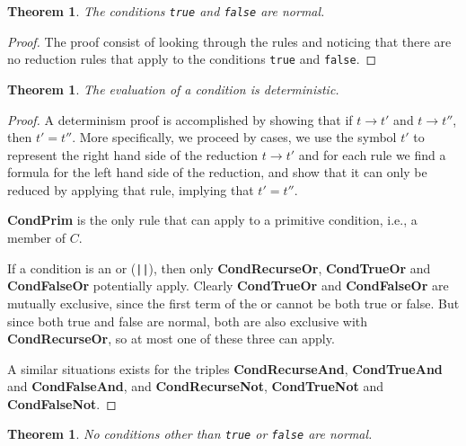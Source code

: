 \documentclass[11pt]{article}
\begin{document}
\newtheorem*{truefalsearenormal}{Theorem}
\begin{truefalsearenormal}
The conditions \texttt{true} and \texttt{false} are normal.
\end{truefalsearenormal}

\begin{proof}
The proof consist of looking through the rules and noticing that there are no reduction rules that apply to the conditions \texttt{true} and \texttt{false}.
\end{proof}

\newtheorem*{conditiondeterminism}{Theorem}
\begin{conditiondeterminism}
The evaluation of a condition is deterministic.
\end{conditiondeterminism}

\begin{proof}

A determinism proof is accomplished by showing that if $t \rightarrow t'$ and $t \rightarrow t''$, then $t' = t''$.  More specifically, we proceed by cases, we use the symbol $t'$ to represent the right hand side of the reduction $t \rightarrow t'$ and for each rule we find a formula for the left hand side of the reduction, and show that it can only be reduced by applying that rule, implying that $t' = t''$.

\textbf{CondPrim} is the only rule that can apply to a primitive condition, i.e., a member of $C$.

If a condition is an or (\texttt{||}), then only \textbf{CondRecurseOr}, \textbf{CondTrueOr} and \textbf{CondFalseOr} potentially apply.  Clearly \textbf{CondTrueOr} and \textbf{CondFalseOr} are mutually exclusive, since the first term of the or cannot be both true or false.  But since both true and false are normal, both are also exclusive with \textbf{CondRecurseOr}, so at most one of these three can apply.

A similar situations exists for the triples \textbf{CondRecurseAnd}, \textbf{CondTrueAnd} and \textbf{CondFalseAnd}, and \textbf{CondRecurseNot}, \textbf{CondTrueNot} and \textbf{CondFalseNot}.

\end{proof}

\newtheorem*{truefalseareuniquelynormal}{Theorem}
\begin{truefalseareuniquelynormal}
No conditions other than \texttt{true} or \texttt{false} are normal.
\end{truefalseareuniquelynormal}
\end{document}
